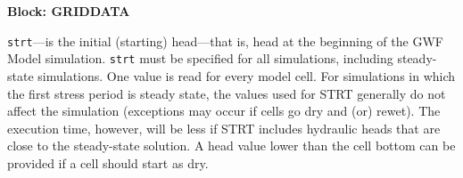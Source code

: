 
\item \textbf{Block: GRIDDATA}

\begin{description}
\item \texttt{strt}---is the initial (starting) head---that is, head at the beginning of the GWF Model simulation.  \texttt{strt} must be specified for all simulations, including steady-state simulations. One value is read for every model cell. For simulations in which the first stress period is steady state, the values used for STRT generally do not affect the simulation (exceptions may occur if cells go dry and (or) rewet). The execution time, however, will be less if STRT includes hydraulic heads that are close to the steady-state solution.  A head value lower than the cell bottom can be provided if a cell should start as dry.

\end{description}


